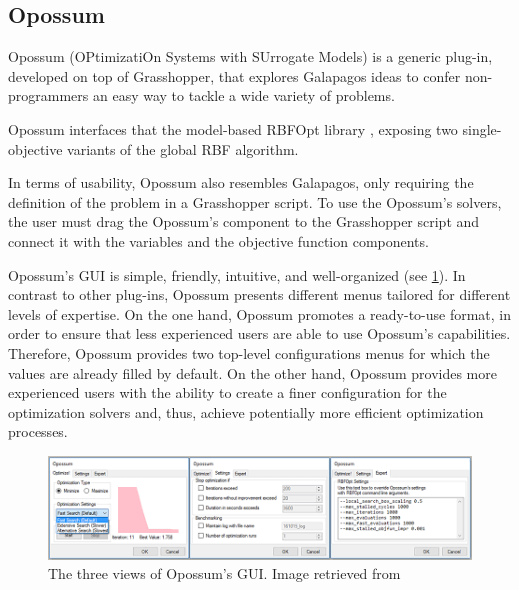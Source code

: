 	\subsection{Opossum}
	Opossum (OPtimizatiOn Systems with SUrrogate Models) \cite{Wortmann2017Opossum} is a generic plug-in, developed on top of Grasshopper, that explores Galapagos ideas to confer non-programmers an easy way to tackle a wide variety of problems.
	
	Opossum interfaces that the model-based RBFOpt library \cite{RBFOPT}, exposing two single-objective variants of the global RBF algorithm. 
	
	In terms of usability, Opossum also resembles Galapagos, only requiring the definition of the problem in a Grasshopper script. To use the Opossum's solvers, the user must drag the Opossum's component to the Grasshopper script and connect it with the variables and the objective function components.
	
	Opossum's \ac{GUI} is simple, friendly, intuitive, and well-organized (see \cref{fig:opossum}). In contrast to other plug-ins, Opossum presents different menus tailored for different levels of expertise. On the one hand, Opossum promotes a ready-to-use format, in order to ensure that less experienced users are able to use Opossum's capabilities. Therefore, Opossum provides two top-level configurations menus for which the values are already filled by default. On the other hand, Opossum provides more experienced users with the ability to create a finer configuration for the optimization solvers and, thus, achieve potentially more efficient optimization processes. 
	
	\begin{figure}
		\centering
		\includegraphics[width=1\textwidth]{Images/Background/Opossum/opossum_1.png}
		\caption[Opossum GUI]{The three views of Opossum's \ac{GUI}. Image retrieved from~\cite{Wortmann2017Opossum}}
		\label{fig:opossum}
	\end{figure}
	
